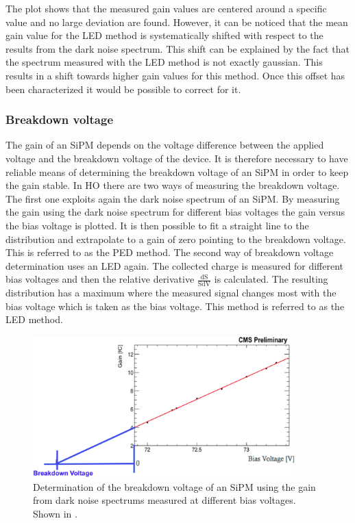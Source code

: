 The plot shows that the measured gain values are centered around a specific value and no large deviation are found. However, it can be noticed that the mean gain value for the LED method is systematically shifted with respect to the results from the dark noise spectrum. This shift can be explained by the fact that the spectrum measured with the LED method is not exactly gaussian. This results in a shift towards higher gain values for this method. Once this offset has been characterized it would be possible to correct for it.

\subsubsection{Breakdown voltage}
The gain of an SiPM depends on the voltage difference between the applied voltage and the breakdown voltage of the device. It is therefore necessary to have reliable means of determining the breakdown voltage of an SiPM in order to keep the gain stable. In HO there are two ways of measuring the breakdown voltage. The first one exploits again the dark noise spectrum of an SiPM. By measuring the gain using the dark noise spectrum for different bias voltages the gain versus the bias voltage is plotted. It is then possible to fit a straight line to the distribution and extrapolate to a gain of zero pointing to the breakdown voltage. This is referred to as the PED method. The second way of breakdown voltage determination uses an LED again. The collected charge is measured for different bias voltages and then the relative derivative $\frac{\text{dS}}{\text{SdV}}$ is calculated. The resulting distribution has a maximum where the measured signal changes most with the bias voltage which is taken as the bias voltage. This method is referred to as the LED method.
\begin{figure}[htbp]
\centering
\includegraphics[width=0.9\textwidth]{Figures/kuensken/bvPedDetermination.png}
\caption{Determination of the breakdown voltage of an SiPM using the gain from dark noise spectrums measured at different bias voltages. Shown in \cite{kuenskenCalor}.}
\label{kuenskenbvPed}
\end{figure}
